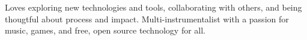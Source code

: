 \documentclass[letter,10pt]{article}
\begin{document}


Loves exploring new technologies and tools, collaborating with others, and being thougtful about process and impact. Multi-instrumentalist with a passion for music, games, and free, open source technology for all.
\end{document}
